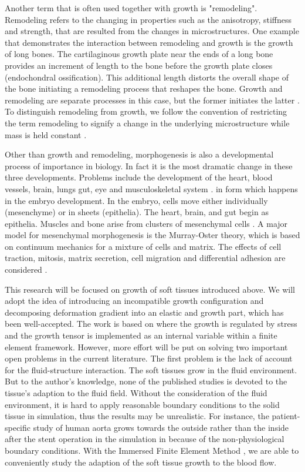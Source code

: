 Another term that is often used together with growth is "remodeling". Remodeling refers to the changing in properties such as the anisotropy, stiffness and strength, that are resulted from the changes in microstructures. One example that demonstrates the interaction between remodeling and growth is the growth of long bones. The cartilaginous growth plate near the ends of a long bone provides an increment of length to the bone before the growth plate closes (endochondral ossification). This additional length distorts the overall shape of the bone initiating a remodeling process that reshapes the bone. Growth and remodeling are separate processes in this case, but the former initiates the latter \cite{Ambrosi}. To distinguish remodeling from growth, we follow the convention of restricting the term remodeling to signify a change in the underlying microstructure while mass is held constant \cite{Kuhl4, Garikipati3}.

Other than growth and remodeling, morphogenesis is  also a developmental process of importance in biology. In fact it is the most dramatic change in these three developments. Problems include the development of the heart, blood vessels, brain, lungs gut, eye and musculoskeletal system \cite{Murray}. in form which happens in the embryo development. In the embryo, cells move either individually (mesenchyme) or in sheets (epithelia). The heart, brain, and gut begin as epithelia. Muscles and bone arise from clusters of mesenchymal cells \cite{Ambrosi}. A major model for mesenchymal morphogenesis is the Murray-Oster theory, which is based on continuum mechanics for a mixture of cells and matrix. The effects of cell traction, mitosis, matrix secretion, cell migration and differential adhesion are considered \cite{Murray2, Oster}.

This research will be focused on growth of soft tissues introduced above. We will adopt the idea of introducing an incompatible growth configuration and decomposing deformation gradient into an elastic and growth part, which has been well-accepted. The work is based on \cite{Himpel, Kuhl3, Goktepe2} where the growth is regulated by stress and the growth tensor is implemented as an internal variable within a finite element framework. However, more effort will be put on solving two important open problems in the current literature. The first problem is the lack of account for the fluid-structure interaction. The soft tissues grow in the fluid environment. But to the author's knowledge, none of the published studies is devoted to the tissue's adaption to the fluid field. Without the consideration of the fluid environment, it is hard to apply reasonable boundary conditions to the solid tissue in simulation, thus the results may be unrealistic. For instance, the patient-specific study of human aorta grows towards the outside rather than the inside after the stent operation in the simulation in \cite{Kuhl3} because of the non-physiological boundary conditions. With the Immersed Finite Element Method \cite{Lucy4}, we are able to conveniently study the adaption of the soft tissue growth to the blood flow.